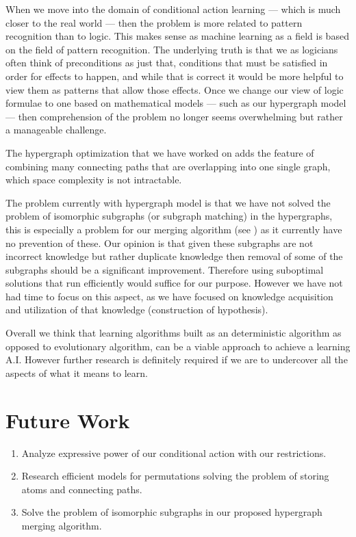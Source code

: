 \documentclass[Master.tex]{subfiles}
\begin{document}
When we move into the domain of conditional action learning --- which is much closer to the real world --- then the problem is more related to pattern recognition than to logic. This makes sense as machine learning as a field is based on the field of pattern recognition. The underlying truth is that we as logicians often think of preconditions as just that, conditions that must be satisfied in order for effects to happen, and while that is correct it would be more helpful to view them as patterns that allow those effects. Once we change our view of logic formulae to one based on mathematical models --- such as our hypergraph model ---	then comprehension of the problem no longer seems overwhelming but rather a manageable challenge. 
	
The hypergraph optimization that we have worked on adds the feature of combining many connecting paths that are overlapping into one single graph, which space complexity is not intractable.
	
	The problem currently with hypergraph model is that we have not solved the problem of isomorphic subgraphs (or subgraph matching) in the hypergraphs, 
	this is especially a problem for our merging algorithm (see ) as it currently have no prevention of these.
	Our opinion is that given these subgraphs are not incorrect knowledge but rather duplicate knowledge then removal of some of the subgraphs should be a significant improvement.
	Therefore using suboptimal solutions that run efficiently would suffice for our purpose. 
	However we have not had time to focus on this aspect, as we have focused on knowledge acquisition and utilization of that knowledge (construction of hypothesis).
	
	
	Overall we think that learning algorithms built as an deterministic algorithm as opposed to evolutionary algorithm, can be a viable approach to achieve a learning A.I. However further research is definitely required if we are to undercover all the aspects of what it means to learn.

\section{Future Work}

\begin{enumerate}
    \item Analyze expressive power of our conditional action with our restrictions.
    \item Research efficient models for permutations solving the problem of storing atoms and connecting paths.
    \item Solve the problem of isomorphic subgraphs in our proposed hypergraph merging algorithm.
\end{enumerate}
	
\end{document}
